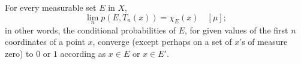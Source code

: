 For every measurable set $E$ in $X$,
$$\lim_n p(E, T_n(x)) = \chi_E(x) \quad [\mu];$$
in other words, the conditional probabilities of $E$, for given values of the first $n$ coordinates of a point $x$, converge (except perhaps on a set of $x$'s of measure zero) to $0$ or $1$ according as $x \in E$ or $x \in E'$.
